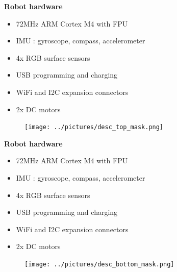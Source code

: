 \documentclass[xcolor=dvipsnames]{beamer}
\begin{document}
\begin{frame}{\bf Robot hardware}

\begin{minipage}{.5\textwidth}

\begin{itemize}
  \item 72MHz ARM Cortex M4 with FPU
  \item IMU : gyroscope, compass, accelerometer
  \item 4x RGB surface sensors
  \item USB programming  and charging
  \item WiFi and I2C expansion connectors
  \item 2x DC motors
\end{itemize}

  \end{minipage}%
\begin{minipage}{.5\textwidth}

  \begin{figure}[!htb]
  \centering
  \texttt{[image: ../pictures/desc\_top\_mask.png]}
  \end{figure}

\end{minipage}

\end{frame}



\begin{frame}{\bf Robot hardware}

\begin{minipage}{.5\textwidth}

\begin{itemize}
  \item 72MHz ARM Cortex M4 with FPU
  \item IMU : gyroscope, compass, accelerometer
  \item 4x RGB surface sensors
  \item USB programming  and charging
  \item WiFi and I2C expansion connectors
  \item 2x DC motors
\end{itemize}

  \end{minipage}%
\begin{minipage}{.5\textwidth}

  \begin{figure}[!htb]
  \centering
  \texttt{[image: ../pictures/desc\_bottom\_mask.png]}
  \end{figure}

\end{minipage}

\end{frame}
\end{document}
